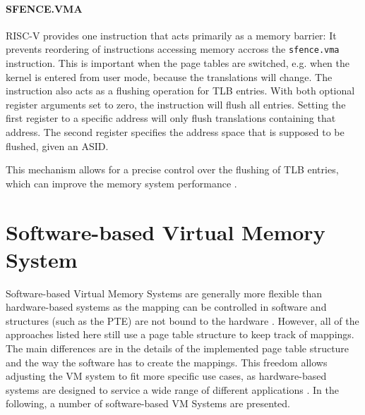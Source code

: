 \paragraph{SFENCE.VMA} RISC-V provides one instruction that acts primarily as a memory barrier:
It prevents reordering of instructions accessing memory accross the \texttt{sfence.vma} instruction.
This is important when the page tables are switched, e.g. when the kernel is entered from user mode,
because the translations will change.
The instruction also acts as a flushing operation for TLB entries. With both optional register
arguments set to zero, the instruction will flush all entries.
Setting the first register to a specific address will only flush translations containing that address.
The second register specifies the address space that is supposed to be flushed, given an ASID.

This mechanism allows for a precise control over the flushing of TLB entries, which can improve the
memory system performance \cite{RISCVInstructionSet}.










\section{Software-based Virtual Memory System}

Software-based Virtual Memory Systems are generally more flexible than hardware-based systems
as the mapping can be controlled in software and structures (such as the PTE) are not bound
to the hardware \cite{jacob1998virtualissues}.
However, all of the approaches listed here still use a page table structure to keep track of mappings.
The main differences are in the details of the implemented page table structure and the way the software has to create the mappings. This freedom allows adjusting the VM system to fit more specific use cases, as hardware-based systems are designed to service a wide range of different applications \cite{jacob1998look}.
In the following, a number of software-based VM Systems are presented.
